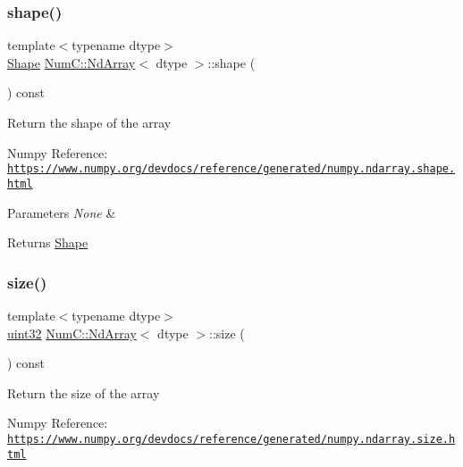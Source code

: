 \subsubsection{\texorpdfstring{shape()}{shape()}}
{\footnotesize\ttfamily template$<$typename dtype$>$ \\
\mbox{\hyperlink{class_num_c_1_1_shape}{Shape}} \mbox{\hyperlink{class_num_c_1_1_nd_array}{Num\+C\+::\+Nd\+Array}}$<$ dtype $>$\+::shape (\begin{DoxyParamCaption}{ }\end{DoxyParamCaption}) const\hspace{0.3cm}{\ttfamily [inline]}}

Return the shape of the array

Numpy Reference\+: \href{https://www.numpy.org/devdocs/reference/generated/numpy.ndarray.shape.html}{\tt https\+://www.\+numpy.\+org/devdocs/reference/generated/numpy.\+ndarray.\+shape.\+html}


\begin{DoxyParams}{Parameters}
{\em None} & \\
\hline
\end{DoxyParams}
\begin{DoxyReturn}{Returns}
\mbox{\hyperlink{class_num_c_1_1_shape}{Shape}} 
\end{DoxyReturn}
\mbox{\label{class_num_c_1_1_nd_array_aedee1cbe27b3a3ff31b06d0003d69632}} 
\subsubsection{\texorpdfstring{size()}{size()}}
{\footnotesize\ttfamily template$<$typename dtype$>$ \\
\mbox{\hyperlink{namespace_num_c_ae685802ca6d3035f2b400b081e3953fa}{uint32}} \mbox{\hyperlink{class_num_c_1_1_nd_array}{Num\+C\+::\+Nd\+Array}}$<$ dtype $>$\+::size (\begin{DoxyParamCaption}{ }\end{DoxyParamCaption}) const\hspace{0.3cm}{\ttfamily [inline]}}

Return the size of the array

Numpy Reference\+: \href{https://www.numpy.org/devdocs/reference/generated/numpy.ndarray.size.html}{\tt https\+://www.\+numpy.\+org/devdocs/reference/generated/numpy.\+ndarray.\+size.\+html}



